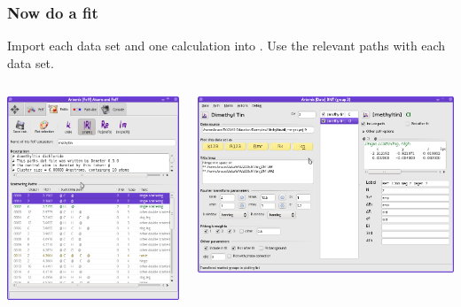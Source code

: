 \documentclass[10pt, xcolor=x11names, compress]{beamer}
\begin{document}


\begin{frame}
  \frametitle{Now do a fit}

  Import each data set and one {\feff} calculation into \artemis.  Use
  the relevant paths with each data set.
  \begin{columns}
    \begin{column}{0.5\linewidth}
      \includegraphics[width=0.85\linewidth]{images/mtin_intrp.png}
    \end{column}
    \begin{column}{0.5\linewidth}
      \includegraphics[width=0.8\linewidth]{images/mtin_fit.png}


\end{column}
\end{columns}
\end{frame}
\end{document}
